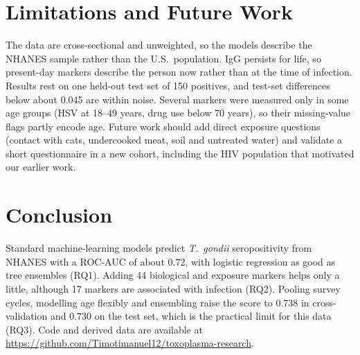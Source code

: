 \documentclass[conference]{IEEEtran}
\begin{document}
\section{Limitations and Future Work}
The data are cross-sectional and unweighted, so the models describe the NHANES sample rather than the U.S.\ population. IgG persists for
life, so present-day markers describe the person now rather than at the time of infection. Results rest on one held-out test set of 150
positives, and test-set differences below about 0.045 are within noise. Several markers were measured only in some age groups (HSV at 18--49 years, drug use below 70 years), so their missing-value flags partly encode age. Future work should add direct exposure questions (contact with
cats, undercooked meat, soil and untreated water) and validate a short questionnaire in a new cohort, including the HIV population that
motivated our earlier work.

\section{Conclusion}
Standard machine-learning models predict \emph{T.\ gondii} seropositivity from NHANES with a ROC-AUC of about 0.72, with logistic
regression as good as tree ensembles (RQ1). Adding 44 biological and exposure markers helps only a little, although 17 markers are
associated with infection (RQ2). Pooling survey cycles, modelling age flexibly and ensembling raise the score to 0.738 in cross-validation
and 0.730 on the test set, which is the practical limit for this data (RQ3). Code and derived data are available at
\url{https://github.com/Timotimanuel12/toxoplasma-research}.
\end{document}
